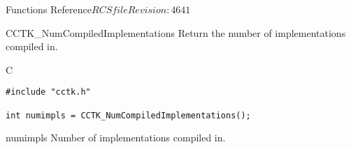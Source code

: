 \begin{cactuspart}{ Functions Reference}{$RCSfile$}{$Revision: 4641 $}
\begin{FunctionDescription}{CCTK\_NumCompiledImplementations}
\label{CCTK-NumCompiledImplementations}
Return the number of implementations compiled in.

\begin{SynopsisSection}
\begin{Synopsis}{C}
\begin{verbatim}
#include "cctk.h"

int numimpls = CCTK_NumCompiledImplementations();
\end{verbatim}
\end{Synopsis}
\end{SynopsisSection}

\begin{ResultSection}
\begin{Result}{numimpls}
Number of implementations compiled in.
\end{Result}
\end{ResultSection}




\end{FunctionDescription}
\end{cactuspart}
